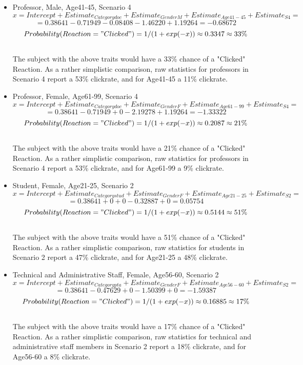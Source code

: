 \documentclass[a4paper]{article}
\begin{document}
\begin{itemize}

\item Professor, Male, Age41-45, Scenario 4 \\
\[ x = Intercept + Estimate_{Categorydoc} + Estimate_{GenderM} + Estimate_{Age41-45} + Estimate_{S4} = \]
\[ = 0.38641 - 0.71949 - 0.08408 - 1.46220 + 1.19264 = -0.68672 \]
\[ Probability(Reaction="Clicked") = 1 / ( 1 + exp(-x)) \approx 0.3347 \approx 33\% \]
\\
The subject with the above traits would have a 33\% chance of a "Clicked" Reaction. As a rather simplistic comparison, raw statistics for professors in Scenario 4 report a 53\% clickrate, and for Age41-45 a 11\% clickrate.

\item Professor, Female, Age61-99, Scenario 4 \\
\[ x = Intercept + Estimate_{Categorydoc} + Estimate_{GenderF} + Estimate_{Age61-99} + Estimate_{S4} = \]
\[ = 0.38641 - 0.71949 + 0 - 2.19278 + 1.19264 = -1.33322 \]
\[ Probability(Reaction="Clicked") = 1 / ( 1 + exp(-x)) \approx 0.2087 \approx 21\% \]
\\
The subject with the above traits would have a 21\% chance of a "Clicked" Reaction. As a rather simplistic comparison, raw statistics for professors in Scenario 4 report a 53\% clickrate, and for Age61-99 a 9\% clickrate.
    
\item Student, Female, Age21-25, Scenario 2 \\
\[ x = Intercept + Estimate_{Categorystud} + Estimate_{GenderF} + Estimate_{Age21-25} + Estimate_{S2} = \]
\[ = 0.38641 + 0 + 0 - 0.32887 + 0 = 0.05754 \]
\[ Probability(Reaction="Clicked") = 1 / ( 1 + exp(-x)) \approx 0.5144 \approx 51\% \]
\\
The subject with the above traits would have a 51\% chance of a "Clicked" Reaction. As a rather simplistic comparison, raw statistics for students in Scenario 2 report a 47\% clickrate, and for Age21-25 a 48\% clickrate.

\item Technical and Administrative Staff, Female, Age56-60, Scenario 2 \\
\[ x = Intercept + Estimate_{Categorypta} + Estimate_{GenderF} + Estimate_{Age56-60} + Estimate_{S2} = \]
\[ = 0.38641 - 0.47629 + 0 - 1.50399 + 0 = -1.59387 \]
\[ Probability(Reaction="Clicked") = 1 / ( 1 + exp(-x)) \approx 0.16885 \approx 17\% \]
\\
The subject with the above traits would have a 17\% chance of a "Clicked" Reaction. As a rather simplistic comparison, raw statistics for technical and administrative staff members in Scenario 2 report a 18\% clickrate, and for Age56-60 a 8\% clickrate.

\end{itemize}
\end{document}
